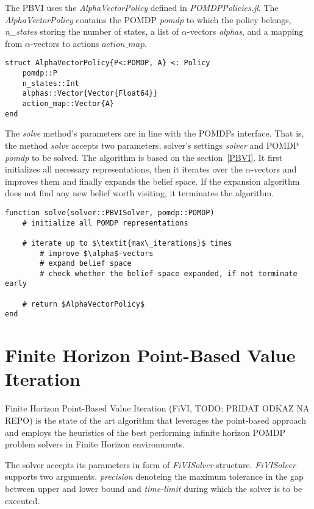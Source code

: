 The PBVI uses the \textit{AlphaVectorPolicy} defined in \textit{POMDPPolicies.jl}. The \textit{AlphaVectorPolicy} contains the POMDP \textit{pomdp} to which the policy belongs, \textit{n\_states} storing the number of states, a list of $\alpha$-vectors \textit{alphas}, and a mapping from $\alpha$-vectors to actions \textit{$action\_map$}.

\begin{samepage}
\begin{verbatim}
struct AlphaVectorPolicy{P<:POMDP, A} <: Policy
    pomdp::P
    n_states::Int
    alphas::Vector{Vector{Float64}}
    action_map::Vector{A}
end
\end{verbatim}
\end{samepage}


The \textit{solve} method's parameters are in line with the POMDPs interface. That is, the method \textit{solve} accepts two parameters, solver's settings \textit{solver} and POMDP \textit{pomdp} to be solved. The algorithm is based on the section~\ref{PBVI}. It first initializes all necessary representations, then it iterates over the $\alpha$-vectors and improves them and finally expands the belief space. If the expansion algorithm does not find any new belief worth visiting, it terminates the algorithm.


\begin{samepage}
\begin{verbatim}
function solve(solver::PBVISolver, pomdp::POMDP)
    # initialize all POMDP representations

    # iterate up to $\textit{max\_iterations}$ times
        # improve $\alpha$-vectors
        # expand belief space
        # check whether the belief space expanded, if not terminate early
    
    # return $AlphaVectorPolicy$
end
\end{verbatim}
\end{samepage}


\section{Finite Horizon Point-Based Value Iteration}
Finite Horizon Point-Based Value Iteration (FiVI, TODO: PRIDAT ODKAZ NA REPO) is the state of the art algorithm that leverages the point-based approach and employs the heuristics of the best performing infinite horizon POMDP problem solvers in Finite Horizon environments. 

The solver accepts its parameters in form of \textit{FiVISolver} structure. \textit{FiVISolver} supports two arguments. \textit{precision} denoteing the maximum tolerance in the gap between upper and lower bound and \textit{time-limit} during which the solver is to be executed.


